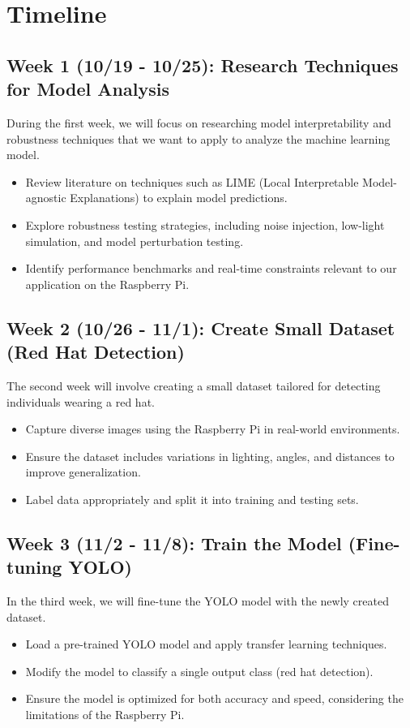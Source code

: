\section{Timeline}
\subsection*{Week 1 (10/19 - 10/25): Research Techniques for Model Analysis}
During the first week, we will focus on researching model interpretability and robustness techniques that we want to apply to analyze the machine learning model. 
\begin{itemize}
    \item Review literature on techniques such as LIME (Local Interpretable Model-agnostic Explanations) to explain model predictions.
    \item Explore robustness testing strategies, including noise injection, low-light simulation, and model perturbation testing.
    \item Identify performance benchmarks and real-time constraints relevant to our application on the Raspberry Pi.
\end{itemize}

\subsection*{Week 2 (10/26 - 11/1): Create Small Dataset (Red Hat Detection)}
The second week will involve creating a small dataset tailored for detecting individuals wearing a red hat.
\begin{itemize}
    \item Capture diverse images using the Raspberry Pi in real-world environments.
    \item Ensure the dataset includes variations in lighting, angles, and distances to improve generalization.
    \item Label data appropriately and split it into training and testing sets.
\end{itemize}

\subsection*{Week 3 (11/2 - 11/8): Train the Model (Fine-tuning YOLO)}
In the third week, we will fine-tune the YOLO model with the newly created dataset.
\begin{itemize}
    \item Load a pre-trained YOLO model and apply transfer learning techniques.
    \item Modify the model to classify a single output class (red hat detection).
    \item Ensure the model is optimized for both accuracy and speed, considering the limitations of the Raspberry Pi.
\end{itemize}

